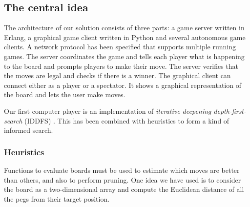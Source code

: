 \documentclass[a4paper,11pt]{article}
\begin{document}
\subsection{The central idea}

The architecture of our solution consists of three parts: a game
server written in Erlang, a graphical game client written in Python
and several autonomous game clients. A network protocol has been
specified that supports multiple running games. The server coordinates
the game and tells each player what is happening to the board and
prompts players to make their move. The server verifies that the moves
are legal and checks if there is a winner. The graphical client can
connect either as a player or a spectator. It shows a graphical
representation of the board and lets the user make moves.


Our first computer player is an implementation of \emph{iterative
  deepening depth-first-search} (IDDFS) \cite{aimodern}. This has been
combined with heuristics to form a kind of informed search.


\subsubsection{Heuristics}
Functions to evaluate boards must be used to estimate which moves are
better than others, and also to perform pruning. One idea we have used
is to consider the board as a two-dimensional array and compute the
Euclidean distance of all the pegs from their target position.

\end{document}

